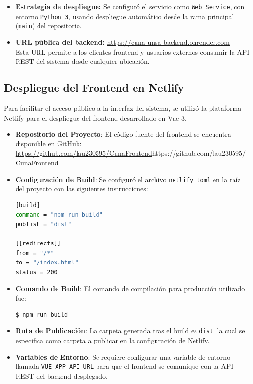 \documentclass{article}
\begin{document}
\begin{itemize}
            \item \textbf{Estrategia de despliegue:} Se configuró el servicio como \texttt{Web Service}, con entorno \texttt{Python 3}, usando despliegue automático desde la rama principal (\texttt{main}) del repositorio.

            \item \textbf{URL pública del backend:} \url{https://cuna-unsa-backend.onrender.com} \\
            Esta URL permite a los clientes frontend y usuarios externos consumir la API REST del sistema desde cualquier ubicación.
        \end{itemize}

    \subsection{Despliegue del Frontend en Netlify}
        Para facilitar el acceso público a la interfaz del sistema, se utilizó la plataforma Netlify para el despliegue del frontend desarrollado en Vue 3.

        \begin{itemize}
            \item \textbf{Repositorio del Proyecto}: El código fuente del frontend se encuentra disponible en GitHub: \url{https://github.com/lau230595/CunaFrontend}{https://github.com/lau230595/CunaFrontend}
            
            \item \textbf{Configuración de Build}: Se configuró el archivo \texttt{netlify.toml} en la raíz del proyecto con las siguientes instrucciones:

            \begin{lstlisting}[language=bash, caption=Archivo netlify.toml]
[build]
command = "npm run build"
publish = "dist"

[[redirects]]
from = "/*"
to = "/index.html"
status = 200
            \end{lstlisting}
            
            \item \textbf{Comando de Build}: El comando de compilación para producción utilizado fue:

            \begin{lstlisting}[language=bash, numbers=none]
        $ npm run build
            \end{lstlisting}
            
            \item \textbf{Ruta de Publicación}: La carpeta generada tras el build es \texttt{dist}, la cual se especifica como carpeta a publicar en la configuración de Netlify.

            \item \textbf{Variables de Entorno}: Se requiere configurar una variable de entorno llamada \texttt{VUE\_APP\_API\_URL} para que el frontend se comunique con la API REST del backend desplegado.             
        \end{itemize}
\end{document}
